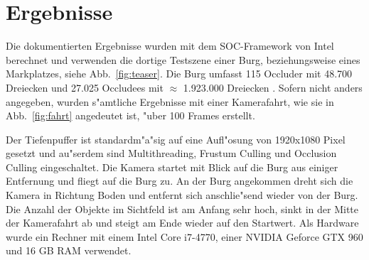 \documentclass[journal]{vgtc}
\begin{document}
\section{Ergebnisse}
Die dokumentierten Ergebnisse wurden mit dem SOC-Framework von Intel berechnet und verwenden die dortige Testszene einer Burg, beziehungsweise eines Markplatzes, siehe Abb.\ \ref{fig:teaser}.
Die Burg umfasst 115 Occluder mit 48.700 Dreiecken und 27.025 Occludees mit $\approx$ 1.923.000 Dreiecken \cite{SOCF}.
Sofern nicht anders angegeben, wurden s"amtliche Ergebnisse mit einer Kamerafahrt, wie sie in Abb.\ \ref{fig:fahrt} angedeutet ist, "uber 100 Frames erstellt.

Der Tiefenpuffer ist standardm"a"sig auf eine Aufl"osung von 1920x1080 Pixel gesetzt und au"serdem sind Multithreading, Frustum Culling und Occlusion Culling eingeschaltet.
Die Kamera startet mit Blick auf die Burg aus einiger Entfernung und fliegt auf die Burg zu.
An der Burg angekommen dreht sich die Kamera in Richtung Boden und entfernt sich anschlie"send wieder von der Burg.
Die Anzahl der Objekte im Sichtfeld ist am Anfang sehr hoch, sinkt in der Mitte der Kamerafahrt ab und steigt am Ende wieder auf den Startwert.
Als Hardware wurde ein Rechner mit einem Intel Core i7-4770, einer NVIDIA Geforce GTX 960 und 16 GB RAM verwendet.\\
\end{document}
